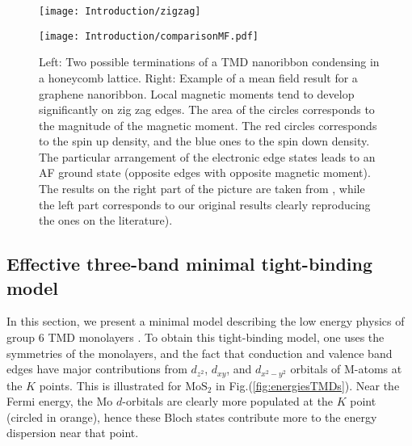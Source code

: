 \begin{figure}[H]
\vspace{-0.5cm}
\hspace{0.5cm}
\begin{minipage}[c]{0.1\textwidth}
\texttt{[image: Introduction/zigzag]}
\end{minipage} \hspace{4.2cm}
\begin{minipage}[c]{0.1\textwidth}
\vspace{0.3cm}
\texttt{[image: Introduction/comparisonMF.pdf]}
\end{minipage}
\vspace{-0.5cm}
 \caption[Zigzag edges of a nanoribbon and magnetism.]{Left: Two possible terminations of a \ac{TMD} nanoribbon condensing in a honeycomb lattice.
Right: Example of a mean field result for a  graphene nanoribbon.
Local magnetic moments tend to develop significantly on zig zag edges.
The area of the circles corresponds to the magnitude of the magnetic moment.
The red circles corresponds to the spin up density, and the blue ones to the spin down density.
The particular arrangement of the electronic edge states leads to an \ac{AF} ground state (opposite edges with opposite magnetic moment). The results on the right part of the picture are taken from \cite{yazyev_emergence_2010}, while the left part corresponds to our original results clearly reproducing the ones on the literature). \label{fig:nanoribbons}}
\end{figure}

\subsection{Effective three-band minimal tight-binding model}\label{subsec:threeband}

In this section, we present a minimal model describing the low energy physics of group 6 \acs{TMD} monolayers \cite{liu_three-band_2013}.
To obtain this tight-binding model, one uses the symmetries of the monolayers, and the fact that conduction and valence band edges have major contributions from $d_{z^2}$, $d_{xy}$, and $d_{x^2 - y^2}$ orbitals of M-atoms at the $K$ points.
This is illustrated for $\text{Mo}\text{S}_2$ in Fig.(\ref{fig:energiesTMDs}).
Near the Fermi energy, the $\text{Mo}$ $d$-orbitals are clearly more populated at the $K$ point (circled in orange), hence these Bloch  states contribute more to the energy dispersion near that point.

